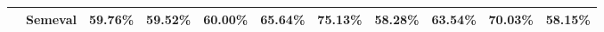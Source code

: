 \begin{tabular}{llrrrrrrrrr}
            & Semeval               &                               59.76\% &                              59.52\% &                              60.00\% &                               65.64\% &                              75.13\% &                              58.28\% &                     63.54\% &                    70.03\% &                    58.15\% \\
\hline
\end{tabular}